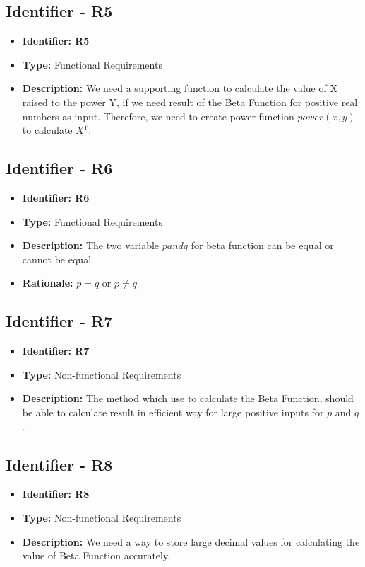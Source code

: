 \documentclass[12pt,report]{article}
\begin{document}
\subsection{Identifier - R5}
\begin{itemize}[noitemsep]
    \item \textbf{Identifier: R5}
    \item \textbf{Type: }Functional Requirements
    \item \textbf{Description: }We need a supporting function to calculate the value of X raised to the power Y, if we need result of the Beta Function for positive real numbers as input. Therefore, we need to create power function $power(x,y)$ to calculate $X^Y$.
\end{itemize}
\subsection{Identifier - R6}
\begin{itemize}[noitemsep]
    \item \textbf{Identifier: R6}
    \item \textbf{Type: }Functional Requirements
    \item \textbf{Description: }The two variable $p and q$ for beta function can be equal or cannot be equal.
    \item \textbf{Rationale: }$p = q$ or $p\neq q$
\end{itemize}
\subsection{Identifier - R7}
\begin{itemize}[noitemsep]
    \item \textbf{Identifier: R7}
    \item \textbf{Type: }Non-functional Requirements
    \item \textbf{Description: }The method which use to calculate the Beta Function, should be able to calculate result in efficient way for large positive inputs for $p$ and $q$.
\end{itemize}
\subsection{Identifier - R8}
\begin{itemize}[noitemsep]
    \item \textbf{Identifier: R8}
    \item \textbf{Type: }Non-functional Requirements
    \item \textbf{Description: }We need a way to store large decimal values for calculating the value of Beta Function accurately.
\end{itemize}
\end{document}

